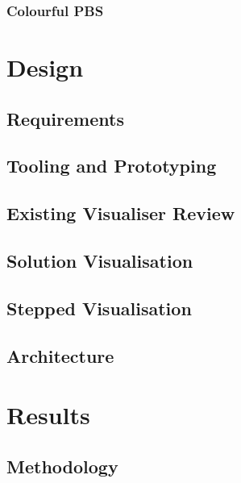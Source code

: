 \documentclass{article}
\begin{document}
        \subsubsection{Colourful PBS}\label{section:colourful_pbs}
        

\newpage
\section{Design}\label{section:design}
    \subsection{Requirements}\label{section:requirements}
    
    
    \subsection{Tooling and Prototyping}\label{section:prototype}
    
    
    \subsection{Existing Visualiser Review}\label{section:visualiser_review}
    
    
    \subsection{Solution Visualisation}\label{section:solution_visualisation}
    
    
    \subsection{Stepped Visualisation}\label{section:stepped_visualisation}
    
    
    \subsection{Architecture}\label{section:architecture}
    

\newpage
\section{Results}\label{section:results}
    \subsection{Methodology}\label{section:methodology}
    
    
\end{document}
